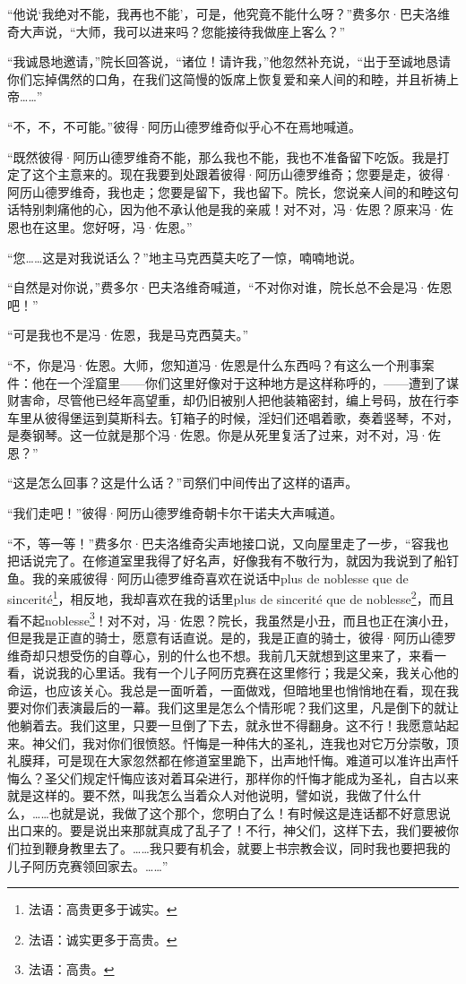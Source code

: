 \par “他说‘我绝对不能，我再也不能’，可是，他究竟不能什么呀？”费多尔·巴夫洛维奇大声说，“大师，我可以进来吗？您能接待我做座上客么？”
\par “我诚恳地邀请，”院长回答说，“诸位！请许我，”他忽然补充说，“出于至诚地恳请你们忘掉偶然的口角，在我们这简慢的饭席上恢复爱和亲人间的和睦，并且祈祷上帝……”
\par “不，不，不可能。”彼得·阿历山德罗维奇似乎心不在焉地喊道。
\par “既然彼得·阿历山德罗维奇不能，那么我也不能，我也不准备留下吃饭。我是打定了这个主意来的。现在我要到处跟着彼得·阿历山德罗维奇；您要是走，彼得·阿历山德罗维奇，我也走；您要是留下，我也留下。院长，您说亲人间的和睦这句话特别刺痛他的心，因为他不承认他是我的亲戚！对不对，冯·佐恩？原来冯·佐恩也在这里。您好呀，冯·佐恩。”
\par “您……这是对我说话么？”地主马克西莫夫吃了一惊，喃喃地说。
\par “自然是对你说，”费多尔·巴夫洛维奇喊道，“不对你对谁，院长总不会是冯·佐恩吧！”
\par “可是我也不是冯·佐恩，我是马克西莫夫。”
\par “不，你是冯·佐恩。大师，您知道冯·佐恩是什么东西吗？有这么一个刑事案件：他在一个淫窟里——你们这里好像对于这种地方是这样称呼的，——遭到了谋财害命，尽管他已经年高望重，却仍旧被别人把他装箱密封，编上号码，放在行李车里从彼得堡运到莫斯科去。钉箱子的时候，淫妇们还唱着歌，奏着竖琴，不对，是奏钢琴。这一位就是那个冯·佐恩。你是从死里复活了过来，对不对，冯·佐恩？”
\par “这是怎么回事？这是什么话？”司祭们中间传出了这样的语声。
\par “我们走吧！”彼得·阿历山德罗维奇朝卡尔干诺夫大声喊道。
\par “不，等一等！”费多尔·巴夫洛维奇尖声地接口说，又向屋里走了一步，“容我也把话说完了。在修道室里我得了好名声，好像我有不敬行为，就因为我说到了船钉鱼。我的亲戚彼得·阿历山德罗维奇喜欢在说话中plus de noblesse que de sincerité\footnote{法语：高贵更多于诚实。}，相反地，我却喜欢在我的话里plus de sincerité que de noblesse\footnote{法语：诚实更多于高贵。}，而且看不起noblesse\footnote{ 法语：高贵。}！对不对，冯·佐恩？院长，我虽然是小丑，而且也正在演小丑，但是我是正直的骑士，愿意有话直说。是的，我是正直的骑士，彼得·阿历山德罗维奇却只想受伤的自尊心，别的什么也不想。我前几天就想到这里来了，来看一看，说说我的心里话。我有一个儿子阿历克赛在这里修行；我是父亲，我关心他的命运，也应该关心。我总是一面听着，一面做戏，但暗地里也悄悄地在看，现在我要对你们表演最后的一幕。我们这里是怎么个情形呢？我们这里，凡是倒下的就让他躺着去。我们这里，只要一旦倒了下去，就永世不得翻身。这不行！我愿意站起来。神父们，我对你们很愤怒。忏悔是一种伟大的圣礼，连我也对它万分崇敬，顶礼膜拜，可是现在大家忽然都在修道室里跪下，出声地忏悔。难道可以准许出声忏悔么？圣父们规定忏悔应该对着耳朵进行，那样你的忏悔才能成为圣礼，自古以来就是这样的。要不然，叫我怎么当着众人对他说明，譬如说，我做了什么什么，……也就是说，我做了这个那个，您明白了么！有时候这是连话都不好意思说出口来的。要是说出来那就真成了乱子了！不行，神父们，这样下去，我们要被你们拉到鞭身教里去了。……我只要有机会，就要上书宗教会议，同时我也要把我的儿子阿历克赛领回家去。……”
